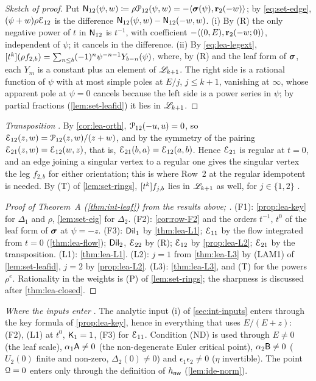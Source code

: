 \begin{proof}[Sketch of proof]
Put $\mathsf{N}_{12}(\psi,w)\coloneqq\rho\mathcal{P}_{12}(\psi,w)=-\langle\boldsymbol{\sigma}(\psi),\mathbf{r}_2(-w)\rangle$; by \eqref{eq:set-edge}, $(\psi+w)\rho\mathcal{E}_{12}$ is the difference $\mathsf{N}_{12}(\psi,w)-\mathsf{N}_{12}(-w,w)$. (i) By (R) the only negative power of $t$ in $\mathsf{N}_{12}$ is $t^{-1}$, with coefficient $-\langle(0,E),\mathbf{r}_2(-w;0)\rangle$, independent of $\psi$; it cancels in the difference. (ii) By \eqref{eq:lea-legext}, $[t^k](\rho f_{2,b})=\sum_{n\leq b}(-1)^n\psi^{-n-1}Y_{b-n}(\psi)$, where, by (R) and the leaf form of $\boldsymbol{\sigma}$, each $Y_m$ is a constant plus an element of $\mathscr{L}_{k+1}$. The right side is a rational function of $\psi$ with at most simple poles at $E/j$, $j\leq k+1$, vanishing at $\infty$, whose apparent pole at $\psi=0$ cancels because the left side is a power series in $\psi$; by partial fractions (\cref{lem:set-leafid}) it lies in $\mathscr{L}_{k+1}$.
\end{proof}

\emph{Transposition} . By \cref{cor:lea-orth}, $\mathcal{P}_{12}(-u,u)=0$, so $\mathcal{E}_{12}(z,w)=\mathcal{P}_{12}(z,w)/(z+w)$, and by the symmetry of the pairing $\mathcal{E}_{21}(z,w)=\mathcal{E}_{12}(w,z)$, that is, $\mathcal{E}_{21}(b,a)=\mathcal{E}_{12}(a,b)$. Hence $\mathcal{E}_{21}$ is regular at $t=0$, and an edge joining a singular vertex to a regular one gives the singular vertex the leg $f_{2,b}$ for either orientation; this is where Row~2 at the regular idempotent is needed. By (T) of \cref{lem:set-rings}, $[t^k]f_{j,b}$ lies in $\mathscr{L}_{k+1}$ as well, for $j\in\{1,2\}$ .

\begin{proof}[Proof of Theorem~A (\cref{thm:int-leaf}) from the results above; {}]
(F1): \cref{prop:lea-key} for $\Delta_1$ and $\rho$, \cref{lem:set-eig} for $\Delta_2$. (F2): \cref{cor:row-F2} and the orders $t^{-1}$, $t^0$ of the leaf form of $\boldsymbol{\sigma}$ at $\psi=-z$. (F3): $\mathsf{Dil}_1$ by \cref{thm:lea-L1}; $\mathcal{E}_{11}$ by the flow integrated from $t=0$ (\cref{thm:lea-flow}); $\mathsf{Dil}_2$, $\mathcal{E}_{22}$ by (R); $\mathcal{E}_{12}$ by \cref{prop:lea-L2}; $\mathcal{E}_{21}$ by the transposition. (L1): \cref{thm:lea-L1}. (L2): $j=1$ from \cref{thm:lea-L3} by (LAM1) of \cref{lem:set-leafid}, $j=2$ by \cref{prop:lea-L2}. (L3): \cref{thm:lea-L3}, and (T) for the powers $\rho^e$. Rationality in the weights is (P) of \cref{lem:set-rings}; the sharpness is discussed after \cref{thm:lea-closed}.
\end{proof}

\emph{Where the inputs enter} . The analytic input (i) of \cref{sec:int-inputs} enters through the key formula of \cref{prop:lea-key}, hence in everything that uses $E/(E+z)$: (F2), (L1) at $t^0$, $\mathsf{K}_{1}=1$, (F3) for $\mathcal{E}_{11}$. Condition (ND) is used through $E\neq0$ (the leaf scale), $\alpha_1\mathsf{A}\neq0$ (the non-degenerate Euler critical point), $\alpha_2\mathsf{B}\neq0$ ($U_2(0)$ finite and non-zero, $\Delta_2(0)\neq0$) and $\epsilon_1\epsilon_2\neq0$ ($\eta$ invertible). The point $\mathcal{Q}=0$ enters only through the definition of $h_{\mathsf{nw}}$ (\cref{lem:ide-norm}).

